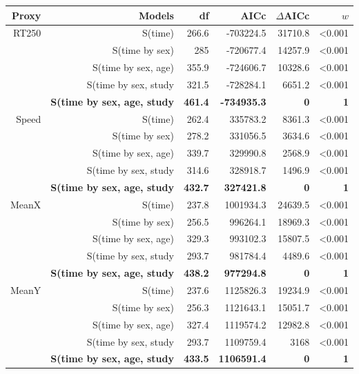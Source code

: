 \documentclass[a4paper,11pt]{article}
\begin{document}
\begin{table}[htbp]
    \begin{tabular}{rrrrrr}
      \\
      \hline  
      Proxy & Models & df    & AICc  & $\Delta$AICc & $w$ \\
      \hline
      RT250 & S(time) & 266.6 & -703224.5 & 31710.8 & <0.001 \\
            & S(time by sex) & 285   & -720677.4 & 14257.9 & <0.001 \\
            & S(time by sex, age) & 355.9 & -724606.7 & 10328.6 & <0.001 \\
            & S(time by sex, study & 321.5 & -728284.1 & 6651.2 & <0.001 \\
            & \textbf{S(time by sex, age, study} & \textbf{461.4} & \textbf{-734935.3} & \textbf{0} & \textbf{1} \\        
      \hline
      Speed & S(time) & 262.4 & 335783.2 & 8361.3 & <0.001 \\
            & S(time by sex) & 278.2 & 331056.5 & 3634.6 & <0.001 \\
            & S(time by sex, age) & 339.7 & 329990.8 & 2568.9 & <0.001 \\
            & S(time by sex, study & 314.6 & 328918.7 & 1496.9 & <0.001 \\
            & \textbf{S(time by sex, age, study} & \textbf{432.7} & \textbf{327421.8} & \textbf{0} & \textbf{1} \\
      \hline
      MeanX & S(time) & 237.8 & 1001934.3 & 24639.5 & <0.001 \\
            & S(time by sex) & 256.5 & 996264.1 & 18969.3 & <0.001 \\
            & S(time by sex, age) & 329.3 & 993102.3 & 15807.5 & <0.001 \\
            & S(time by sex, study & 293.7 & 981784.4 & 4489.6 & <0.001 \\
            & \textbf{S(time by sex, age, study} & \textbf{438.2} & \textbf{977294.8} & \textbf{0} & \textbf{1} \\       
      \hline
      MeanY & S(time) & 237.6 & 1125826.3 & 19234.9 & <0.001 \\
            & S(time by sex) & 256.3 & 1121643.1 & 15051.7 & <0.001 \\
            & S(time by sex, age) & 327.4 & 1119574.2 & 12982.8 & <0.001 \\
            & S(time by sex, study & 293.7 & 1109759.4 & 3168  & <0.001 \\
            & \textbf{S(time by sex, age, study} & \textbf{433.5} & \textbf{1106591.4} & \textbf{0} & \textbf{1} \\
      \hline 
    \end{tabular}
  \label{tab:addlabel}
  \end{table}
 
\end{document}
